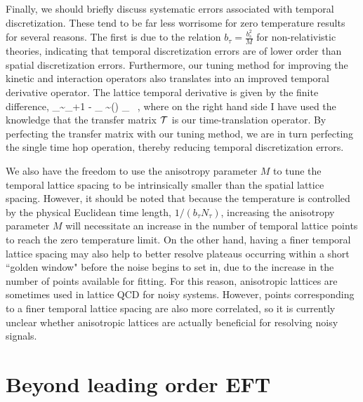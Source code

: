 Finally, we should briefly discuss systematic errors associated with temporal discretization. These tend to be far less worrisome for zero temperature results for several reasons. The first is due to the relation $b_{\tau} = \frac{b_s^2}{M}$ for non-relativistic theories, indicating that temporal discretization errors are of lower order than spatial discretization errors. Furthermore, our tuning method for improving the kinetic and interaction operators also translates into an improved temporal derivative operator. The lattice temporal derivative is given by the finite difference,
\beq
\partial_{\tau}\psi \sim \psi_{\tau+1} - \psi_{\tau} \sim \left(\right) \psi_{\tau} \ ,
\eeq
where on the right hand side I have used the knowledge that the transfer matrix ${\mathcal{ T}}$ is our time-translation operator. By perfecting the transfer matrix with our tuning method, we are in turn perfecting the single time hop operation, thereby reducing temporal discretization errors.

We also have the freedom to use the anisotropy parameter $M$ to tune the temporal lattice spacing to be intrinsically smaller than the spatial lattice spacing. However, it should be noted that because the temperature is controlled by the physical Euclidean time length, $1/\left(b_{\tau}N_{\tau}\right)$, increasing the anisotropy parameter $M$ will necessitate an increase in the number of temporal lattice points to reach the zero temperature limit. On the other hand, having a finer temporal lattice spacing may also help to better resolve plateaus occurring within a short ``golden window" before the noise begins to set in, due to the increase in the number of points available for fitting. For this reason, anisotropic lattices are sometimes used in lattice QCD for noisy systems. However, points corresponding to a finer temporal lattice spacing are also more correlated, so it is currently unclear whether anisotropic lattices are actually beneficial for resolving noisy signals.

\section{\label{sec:NLO}Beyond leading order EFT}

